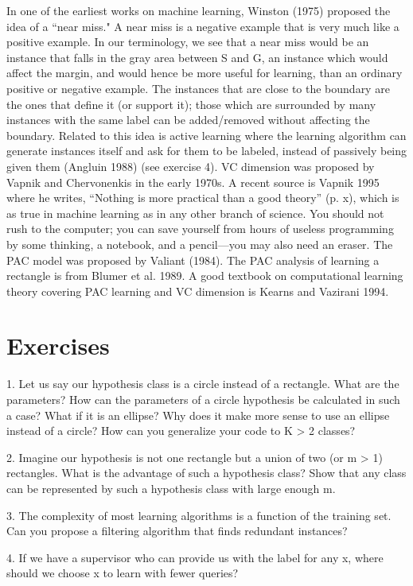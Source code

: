 In one of the earliest works on machine learning, Winston (1975) proposed the idea of a “near miss." A near miss is a negative example that is very much like a positive example. In our terminology, we see that a near miss would be an instance that falls in the gray area between S and G, an instance which would affect the margin, and would hence be more useful for learning, than an ordinary positive or negative example. The instances that are close to the boundary are the ones that define it (or support it); those which are surrounded by many instances with the same label can be added/removed without affecting the boundary. Related to this idea is active learning where the learning algorithm can generate instances itself and ask for them to be labeled, instead of passively being given them (Angluin 1988) (see exercise 4). VC dimension was proposed by Vapnik and Chervonenkis in the early 1970s. A recent source is Vapnik 1995 where he writes, “Nothing is more practical than a good theory” (p. x), which is as true in machine learning as in any other branch of science. You should not rush to the computer; you can save yourself from hours of useless programming by some thinking, a notebook, and a pencil---you may also need an eraser. The PAC model was proposed by Valiant (1984). The PAC analysis of learning a rectangle is from Blumer et al. 1989. A good textbook on computational learning theory covering PAC learning and VC dimension is Kearns and Vazirani 1994.

\section{Exercises}

1. Let us say our hypothesis class is a circle instead of a rectangle. What are the parameters? How can the parameters of a circle hypothesis be calculated in such a case? What if it is an ellipse? Why does it make more sense to use an ellipse instead of a circle? How can you generalize your code to K > 2 classes?

2. Imagine our hypothesis is not one rectangle but a union of two (or m > 1) rectangles. What is the advantage of such a hypothesis class? Show that any class can be represented by such a hypothesis class with large enough m.

3. The complexity of most learning algorithms is a function of the training set. Can you propose a filtering algorithm that finds redundant instances?

4. If we have a supervisor who can provide us with the label for any x, where should we choose x to learn with fewer queries?

